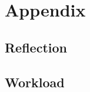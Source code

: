 \section{Appendix}

\subsection{Reflection}\label{sec:reflection}


\subsection{Workload}\label{sec:workload}

